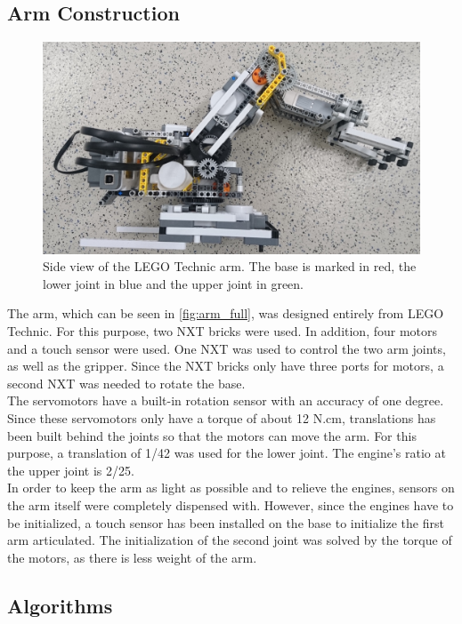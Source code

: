 \documentclass[conference]{IEEEtran}
\begin{document}
\subsection{Arm Construction}\label{sec:construction}
\begin{figure}[bt] 
	\centering
	\includegraphics[width=\textwidth/2]{img/arm_full}
	\caption[caption]{Side view of the LEGO Technic arm. The base is marked in red, the lower joint in blue and the upper joint in green.}
	\label{fig:arm_full}
\end{figure}
The arm, which can be seen in \autoref{fig:arm_full}, was designed entirely from LEGO Technic. For this purpose, two NXT bricks were used. In addition, four motors and a touch sensor were used. One NXT was used to control the two arm joints, as well as the gripper. Since the NXT bricks only have three ports for motors, a second NXT was needed to rotate the base.\\
The servomotors have a built-in rotation sensor with an accuracy of one degree. Since these servomotors only have a torque of about 12 N.cm, translations has been built behind the joints so that the motors can move the arm. For this purpose, a translation of 1/42 was used for the lower joint. The engine's ratio at the upper joint is 2/25.\\
In order to keep the arm as light as possible and to relieve the engines, sensors on the arm itself were completely dispensed with. However, since the engines have to be initialized, a touch sensor has been installed on the base to initialize the first arm articulated. The initialization of the second joint was solved by the torque of the motors, as there is less weight of the arm.

\subsection{Algorithms}\label{sec:algorithms}
\end{document}
